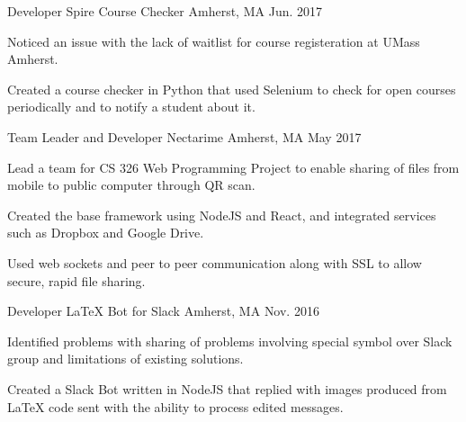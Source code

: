 

\begin{cventries}

  \cventry
    {Developer} %
    {Spire Course Checker} %
    {Amherst, MA} %
    {Jun. 2017} %
    {
      \begin{cvitems} %
      	\item Noticed an issue with the lack of waitlist for course registeration at UMass Amherst.
        \item Created a course checker in Python that used Selenium to check for open courses periodically and to notify a student about it.
      \end{cvitems}
    }

  \cventry
    {Team Leader and Developer} %
    {Nectarime} %
    {Amherst, MA} %
    {May 2017} %
    {
      \begin{cvitems} %
        \item Lead a team for CS 326 Web Programming Project to enable sharing of files from mobile to public computer through QR scan.
        \item Created the base framework using NodeJS and React, and integrated services such as Dropbox and Google Drive.
        \item Used web sockets and peer to peer communication along with SSL to allow secure, rapid file sharing.
      \end{cvitems}
    }

  \cventry
    {Developer} %
    {{\selectfont \LaTeX } Bot for Slack} %
    {Amherst, MA} %
    {Nov. 2016} %
    {
      \begin{cvitems} %
        \item Identified problems with sharing of problems involving special symbol over Slack group and limitations of existing solutions.
        \item Created a Slack Bot written in NodeJS that replied with images produced from {\selectfont \LaTeX } code sent with the ability to process edited messages.
      \end{cvitems}
    }


\end{cventries}

